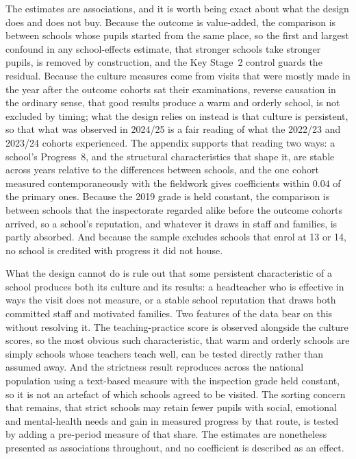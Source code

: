 The estimates are associations, and it is worth being exact about what the
design does and does not buy. Because the outcome is value-added, the
comparison is between schools whose pupils started from the same place, so
the first and largest confound in any school-effects estimate, that stronger
schools take stronger pupils, is removed by construction, and the Key
Stage~2 control guards the residual. Because the culture measures come from
visits that were mostly made in the year after the outcome cohorts sat their
examinations, reverse causation in the ordinary sense, that good results
produce a warm and orderly school, is not excluded by timing; what the design
relies on instead is that culture is persistent, so that what was observed
in 2024/25 is a fair reading of what the 2022/23 and 2023/24 cohorts
experienced. The appendix supports that reading two ways: a school's
Progress~8, and the structural characteristics that shape it, are stable
across years relative to the differences between schools, and the one cohort
measured contemporaneously with the fieldwork gives coefficients within
$0.04$ of the primary ones. Because the 2019 grade is held constant, the
comparison is between schools that the inspectorate regarded alike before the
outcome cohorts arrived, so a school's reputation, and whatever it draws in
staff and families, is partly absorbed. And because the sample excludes
schools that enrol at 13 or 14, no school is credited with progress it did
not house.

What the design cannot do is rule out that some persistent characteristic of
a school produces both its culture and its results: a headteacher who is
effective in ways the visit does not measure, or a stable school reputation
that draws both committed staff and motivated families. Two features of the
data bear on this without resolving it. The teaching-practice score is
observed alongside the culture scores, so the most obvious such
characteristic, that warm and orderly schools are simply schools whose
teachers teach well, can be tested directly rather than assumed away. And the
strictness result reproduces across the national population using a
text-based measure with the inspection grade held constant, so it is not an
artefact of which schools agreed to be visited. The sorting concern that
remains, that strict schools may retain fewer pupils with social, emotional
and mental-health needs and gain in measured progress by that route, is
tested by adding a pre-period measure of that share. The estimates are
nonetheless presented as associations throughout, and no coefficient is
described as an effect.

